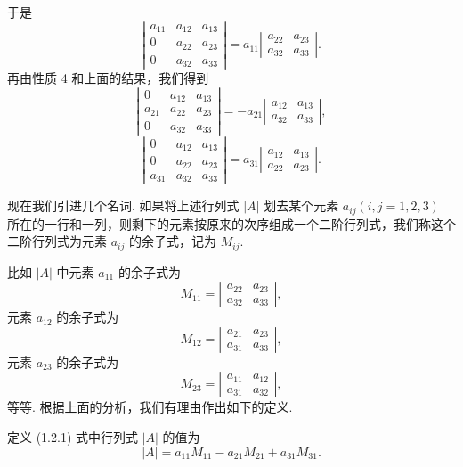 \documentclass[UTF8, 12pt, fontset=fandol, oneside]{ctexart}
\begin{document}
于是
\[
\left|\begin{array}{ccc}
a_{11} & a_{12} & a_{13}\\
0 & a_{22} & a_{23}\\
0 & a_{32} & a_{33}
\end{array}\right|
=a_{11}
\left|\begin{array}{cc}
a_{22} & a_{23}\\
a_{32} & a_{33}
\end{array}\right|.
\]
再由性质 4 和上面的结果，我们得到
\[
\left|\begin{array}{ccc}
0 & a_{12} & a_{13}\\
a_{21} & a_{22} & a_{23}\\
0 & a_{32} & a_{33}
\end{array}\right|
=-a_{21}
\left|\begin{array}{cc}
a_{12} & a_{13}\\
a_{32} & a_{33}
\end{array}\right|,
\]
\[
\left|\begin{array}{ccc}
0 & a_{12} & a_{13}\\
0 & a_{22} & a_{23}\\
a_{31} & a_{32} & a_{33}
\end{array}\right|
=a_{31}
\left|\begin{array}{cc}
a_{12} & a_{13}\\
a_{22} & a_{23}
\end{array}\right|.
\]

现在我们引进几个名词. 如果将上述行列式 $|A|$ 划去某个元素 $a_{ij}(i,j=1,2,3)$ 所在的一行和一列，则剩下的元素按原来的次序组成一个二阶行列式，我们称这个二阶行列式为元素 $a_{ij}$ 的余子式，记为 $M_{ij}$.

比如 $|A|$ 中元素 $a_{11}$ 的余子式为
\[
M_{11}=
\left|\begin{array}{cc}
a_{22} & a_{23}\\
a_{32} & a_{33}
\end{array}\right|,
\]
元素 $a_{12}$ 的余子式为
\[
M_{12}=
\left|\begin{array}{cc}
a_{21} & a_{23}\\
a_{31} & a_{33}
\end{array}\right|,
\]
元素 $a_{23}$ 的余子式为
\[
M_{23}=
\left|\begin{array}{cc}
a_{11} & a_{12}\\
a_{31} & a_{32}
\end{array}\right|,
\]
等等.
根据上面的分析，我们有理由作出如下的定义.

定义 (1.2.1) 式中行列式 $|A|$ 的值为
\[
|A|=a_{11}M_{11}-a_{21}M_{21}+a_{31}M_{31}.
\]
\end{document}
